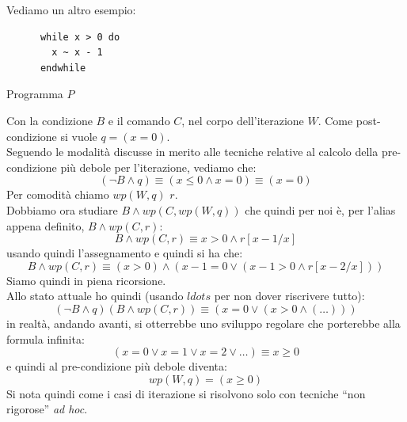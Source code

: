 				      				\begin{esempio}
				      					Vediamo un altro esempio:
				      					\begin{listing}[H]
				      						\begin{lstlisting}
      while x > 0 do
        x ~ x - 1
      endwhile
				      						\end{lstlisting}
				      						\caption{Programma $P$}
				      					\end{listing}
				      					Con la condizione $B$ e il comando $C$, nel corpo dell'iterazione $W$. Come
				      					post-condizione si vuole $q=(x=0)$.\\
				      					Seguendo le modalità discusse in merito alle tecniche relative al calcolo
				      					della pre-condizione più debole per l'iterazione, vediamo che:
				      					\[(\neg B\land q)\equiv (x\leq 0\land x=0)\equiv (x=0)\]
				      					Per comodità chiamo $wp(W, q)$ $r$.\\ 
				      					Dobbiamo ora studiare $B\land wp(C, wp(W, q))$ che quindi per noi è, per l'alias
				      					appena definito, $B\land wp(C, r)$:
				      					\[B\land wp(C, r)\equiv x>0\land r[x-1/x]\]
				      					usando quindi l'assegnamento e quindi si ha che:
				      					\[B\land wp(C, r)\equiv (x>0)\land (x-1=0\lor (x-1>0\land r[x-2/x]))\]
				      					Siamo quindi in piena ricorsione.\\
				      					Allo stato attuale ho quindi (usando $ldots$ per non dover riscrivere tutto):
				      					\[(\neg B\land q)(B\land wp(C, r))\equiv (x=0 \lor(x>0\land(\ldots)))\]
				      					in realtà, andando avanti, si otterrebbe uno sviluppo regolare che porterebbe
				      					alla formula infinita:
				      					\[(x=0\lor x=1\lor x=2\lor \ldots)\equiv x\geq 0\]
				      					e quindi al pre-condizione più debole diventa:
				      					\[wp(W, q)=(x\geq 0)\]
				      					Si nota quindi come i casi di iterazione si risolvono solo con tecniche ``non
				      					rigorose'' \textit{ad hoc}.
				      				\end{esempio}
